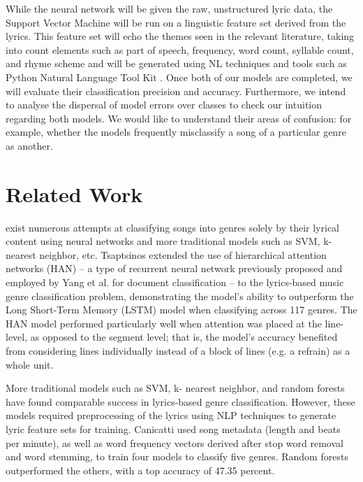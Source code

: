 \documentclass[journal]{IEEEtran}
\begin{document}
While the neural network will be given the raw, unstructured lyric data, the Support Vector Machine will be run on a linguistic feature set derived from the lyrics. This feature set will echo the themes seen in the relevant literature, taking into count elements such as part of speech, frequency, word count, syllable count, and rhyme scheme and will be generated using NL techniques and tools such as Python Natural Language Tool Kit \cite{NLTK}. Once both of our models are completed, we will evaluate their classification precision and accuracy. Furthermore, we intend to analyse the dispersal of model errors over classes to check our intuition regarding both models. We would like to understand their areas of confusion: for example, whether the models frequently misclassify a song of a particular genre as another.



\section{Related Work}

 exist numerous attempts at classifying songs into genres solely by their lyrical content using neural networks and more traditional models such as SVM, k-nearest neighbor, etc. 
Tsaptsinos \cite{tsaptsinos} extended the use of hierarchical attention networks (HAN) -- a type of recurrent neural network previously proposed and employed by Yang et al. \cite{Yang} for document classification -- to the lyrics-based music genre classification problem, demonstrating the model's ability to outperform the Long Short-Term Memory (LSTM) model when classifying across 117 genres. The HAN model performed particularly well when attention was placed at the line-level, as opposed to the segment level; that is, the model's accuracy benefited from considering lines individually instead of a block of lines (e.g. a refrain) as a whole unit. \par

More traditional models such as SVM, k- nearest neighbor, and random forests have found comparable success in lyrics-based genre classification. However, these models required preprocessing of the lyrics using NLP techniques to generate lyric feature sets for training. Canicatti \cite{canicatti} used song metadata (length and beats per minute), as well as word frequency vectors derived after stop word removal and word stemming, to train four models to classify five genres. Random forests outperformed the others, with a top accuracy of 47.35 percent. \par
\end{document}
